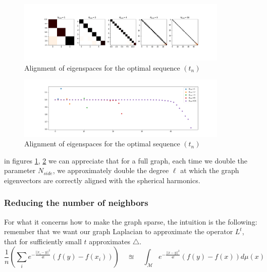 \begin{figure}[h]
	\label{fig:optimal graph}
	
	\centering
	\includegraphics[width=0.9\textwidth]{../codes/02.HeatKernelGraphLaplacian/HEALPix/06_figures/optimal_full.png}	
\caption{Alignment of eigenspaces for the optimal sequence $(t_n)$}
\end{figure}
\begin{figure}[h]
	\label{fig:optimal graph diagonal}
	
	\centering
	\includegraphics[width=0.9\textwidth]{../codes/02.HeatKernelGraphLaplacian/HEALPix/06_figures/optimal_full_diagonal.png}
	\caption{Alignment of eigenspaces for the optimal sequence $(t_n)$}	
\end{figure}

in figures \ref{fig:optimal graph}, \ref{fig:optimal graph diagonal} we can appreciate that for a full graph, each time we double the parameter $N_{side}$, we approximately double the degree $\ell$ at which the graph eigenvectors are correctly aligned with the spherical harmonics.
\subsubsection{Reducing the number of neighbors}
For what it concerns how to make the graph sparse, the intuition is the following: remember that we want our graph Laplacian to approximate the operator $L^t$, that for sufficiently small $t$ approximates $\triangle$.
$$\frac{1}{n}\left(\sum_i e^{-\frac{||x_i-y||^2}{4t}}(f(y)-f(x_i)) \right) \quad \approxeq \quad \int_\mathcal M e^{-\frac{||x-y||^2}{4t}}\left(f(y)-f(x)\right)d\mu(x) $$

